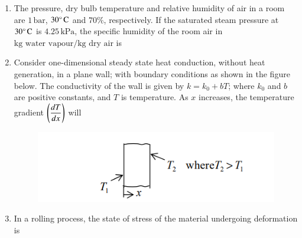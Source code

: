 \documentclass[journal]{IEEEtran}
\begin{document}
\begin{enumerate}[leftmargin=0pt]
\item The pressure, dry bulb temperature and relative humidity of air in a room are $1\,\text{bar}$, $30\degree\,\text{C}$ and $70\%$, respectively. If the saturated steam pressure at $30\degree\,\text{C}$ is $4.25\,\text{kPa}$, the specific humidity of the room air in $\text{kg water vapour}/\text{kg dry air}$ is
\begin{enumerate}
\end{enumerate}

\hfill{}

\item Consider one-dimensional steady state heat conduction, without heat generation, in a plane wall; with boundary conditions as shown in the figure below. The conductivity of the wall is given by $k = k_0 + bT$; where $k_0$ and $b$ are positive constants, and $T$ is temperature. As $x$ increases, the temperature gradient $\left(\dfrac{dT}{dx}\right)$ will
\begin{figure}[h]
\centering
\includegraphics[width=0.5\columnwidth]{Figs/image (19).png}
\caption*{}
\label{fig:9}
\end{figure}
\begin{enumerate}
\end{enumerate}

\hfill{}

\item In a rolling process, the state of stress of the material undergoing deformation is
\begin{enumerate}
\end{enumerate}


\end{enumerate}
\end{document}
